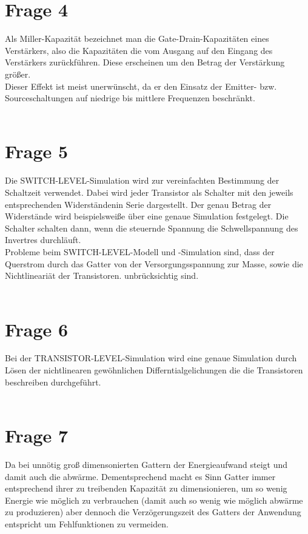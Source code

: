 \documentclass[a4paper]{scrartcl}
\begin{document}
\section*{Frage 4}
Als Miller-Kapazität bezeichnet man die Gate-Drain-Kapazitäten eines Verstärkers, also die Kapazitäten die vom Ausgang auf den Eingang des Verstärkers zurückführen. Diese erscheinen um den Betrag der Verstärkung größer.\\
Dieser Effekt ist meist unerwünscht, da er den Einsatz der Emitter- bzw. Sourceschaltungen auf niedrige bis mittlere Frequenzen beschränkt.
~\\
~\\
\section*{Frage 5}
Die SWITCH-LEVEL-Simulation wird zur vereinfachten Bestimmung der Schaltzeit verwendet. Dabei wird jeder Transistor als Schalter mit den jeweils entsprechenden Widerständenin Serie dargestellt. Der genau Betrag der Widerstände wird beispielsweiße über eine genaue Simulation festgelegt. Die Schalter schalten dann, wenn die steuernde Spannung die Schwellspannung des Invertres durchläuft.\\
Probleme beim SWITCH-LEVEL-Modell und -Simulation sind, dass der Querstrom durch das Gatter von der Versorgungsspannung zur Masse, sowie die Nichtlineariät der Transistoren. unbrücksichtig sind.
~\\
~\\
\section*{Frage 6}
Bei der TRANSISTOR-LEVEL-Simulation wird eine genaue Simulation durch Lösen der nichtlinearen gewöhnlichen Differntialgelichungen die die Transistoren beschreiben durchgeführt.
~\\
~\\
\section*{Frage 7}
Da bei unnötig groß dimensonierten Gattern der Energieaufwand steigt und damit auch die abwärme. Dementsprechend macht es Sinn Gatter immer entsprechend ihrer zu treibenden Kapazität zu dimensionieren, um so wenig Energie wie möglich zu verbrauchen (damit auch so wenig wie möglich abwärme zu produzieren) aber dennoch die Verzögerungszeit des Gatters der Anwendung entspricht um Fehlfunktionen zu vermeiden.
~\\
~\\
\end{document}
